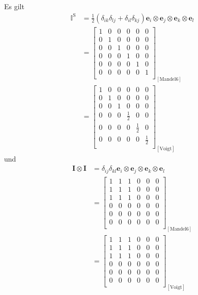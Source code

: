\documentclass[10pt,a4paper,oneside]{article}
\begin{document}
Es gilt
\begin{align}
\mathbb{I}^{\text{S}}
&=
\frac{1}{2}
\left(
	\delta_{ik} \delta_{lj}+ \delta_{il} \delta_{kj}
\right)
\mathbf{e}_{i}
\otimes
\mathbf{e}_{j}
\otimes
\mathbf{e}_{k}
\otimes
\mathbf{e}_{l} \\
&=
	\begin{bmatrix}
  1 & 0 & 0 & 0 & 0 & 0 \\
  0 & 1 & 0 & 0 & 0 & 0 \\
  0 & 0 & 1 & 0 & 0 & 0 \\
  0 & 0 & 0 & 1 & 0 & 0 \\
  0 & 0 & 0 & 0 & 1 & 0 \\
  0 & 0 & 0 & 0 & 0 & 1 \\
	\end{bmatrix}_{[\text{Mandel6}]}\\
&=
	\begin{bmatrix}
  1 & 0 & 0 & 0 & 0 & 0 \\
  0 & 1 & 0 & 0 & 0 & 0 \\
  0 & 0 & 1 & 0 & 0 & 0 \\
  0 & 0 & 0 & \frac{1}{2} & 0 & 0 \\
  0 & 0 & 0 & 0 & \frac{1}{2} & 0 \\
  0 & 0 & 0 & 0 & 0 & \frac{1}{2} \\
	\end{bmatrix}_{[\text{Voigt}]}
\end{align}
und
\begin{align}
\mathbf{I} \otimes \mathbf{I}
&=
\delta_{ij} \delta_{kl}
\mathbf{e}_{i}
\otimes
\mathbf{e}_{j}
\otimes
\mathbf{e}_{k}
\otimes
\mathbf{e}_{l} \\
&=
	\begin{bmatrix}
  1 & 1 & 1 & 0 & 0 & 0 \\
  1 & 1 & 1 & 0 & 0 & 0 \\
  1 & 1 & 1 & 0 & 0 & 0 \\
  0 & 0 & 0 & 0 & 0 & 0 \\
  0 & 0 & 0 & 0 & 0 & 0 \\
  0 & 0 & 0 & 0 & 0 & 0 \\
	\end{bmatrix}_{[\text{Mandel6}]}\\
&=
	\begin{bmatrix}
  1 & 1 & 1 & 0 & 0 & 0 \\
  1 & 1 & 1 & 0 & 0 & 0 \\
  1 & 1 & 1 & 0 & 0 & 0 \\
  0 & 0 & 0 & 0 & 0 & 0 \\
  0 & 0 & 0 & 0 & 0 & 0 \\
  0 & 0 & 0 & 0 & 0 & 0 \\
	\end{bmatrix}_{[\text{Voigt}]}
\end{align}
\end{document}
